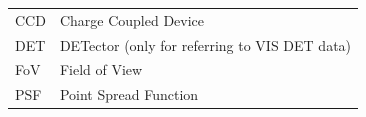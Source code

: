 \documentclass[11pt]{EuclidVIS}
\numberwithin{table}{section}
\numberwithin{figure}{section}
\begin{document}
\begin{tabular}{l l}
CCD & Charge Coupled Device \\
DET & DETector  (only for referring to VIS DET data)\\
FoV & Field of View \\
PSF & Point Spread Function\\

\end{tabular}
\end{document}
